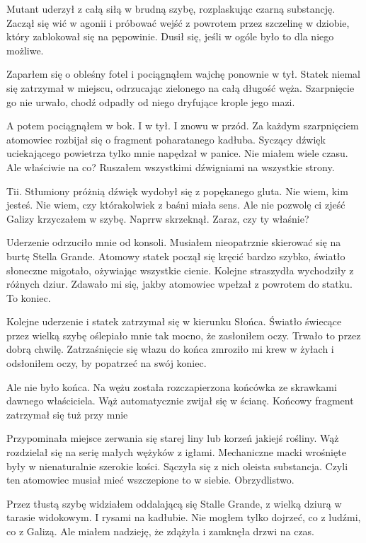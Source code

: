 Mutant uderzył z całą siłą w brudną szybę, rozplaskując czarną substancję. 
Zaczął się wić w agonii i próbować wejść z powrotem przez szczelinę w dziobie, który zablokował się na pępowinie.
Dusił się, jeśli w ogóle było to dla niego możliwe.

Zaparłem się o obleśny fotel i pociągnąłem wajchę ponownie w tył. Statek niemal się zatrzymał w miejscu, odrzucając zielonego na całą długość węża.
Szarpnięcie go nie urwało, chodź odpadły od niego dryfujące krople jego mazi.

A potem pociągnąłem w bok. I w tył. I znowu w przód.
Za każdym szarpnięciem atomowiec rozbijał się o fragment poharatanego kadłuba.
Syczący dźwięk uciekającego powietrza tylko mnie napędzał w panice.
Nie miałem wiele czasu. Ale właściwie na co?
Ruszałem wszystkimi dźwigniami na wszystkie strony.

\begin{dialogue}
	\ds{} Tii. \dm{} Stłumiony próżnią dźwięk wydobył się z popękanego gluta.
	\ds{} Nie wiem, kim jesteś. Nie wiem, czy którakolwiek z baśni miała sens. Ale nie pozwolę ci zjeść Galizy \dm{} krzyczałem w szybę. 
	\ds{} Naprrw \dm{} skrzeknął.
	\ds{} Zaraz, czy ty właśnie?
\end{dialogue}

Uderzenie odrzuciło mnie od konsoli.
Musiałem nieopatrznie skierować się na burtę Stella Grande.
Atomowy statek począł się kręcić bardzo szybko, światło słoneczne migotało, ożywiając wszystkie cienie.
Kolejne straszydła wychodziły z różnych dziur.
Zdawało mi się, jakby atomowiec wpełzał z powrotem do statku.
To koniec.

Kolejne uderzenie i statek zatrzymał się w kierunku Słońca.
Światło świecące przez wielką szybę oślepiało mnie tak mocno, że zasłoniłem oczy.
Trwało to przez dobrą chwilę.
Zatrzaśnięcie się włazu do końca zmroziło mi krew w żyłach i odsłoniłem oczy, by popatrzeć na swój koniec.

Ale nie było końca.
Na wężu została rozczapierzona końcówka ze skrawkami dawnego właściciela.
Wąż automatycznie zwijał się w ścianę.
Końcowy fragment zatrzymał się tuż przy mnie

Przypominała miejsce zerwania się starej liny lub korzeń jakiejś rośliny.
Wąż rozdzielał się na serię małych wężyków z igłami.
Mechaniczne macki wrośnięte były w nienaturalnie szerokie kości.
Sączyła się z nich oleista substancja.
Czyli ten atomowiec musiał mieć wszczepione to w siebie.
Obrzydlistwo.

Przez tłustą szybę widziałem oddalającą się Stalle Grande, z wielką dziurą w tarasie widokowym.
I rysami na kadłubie.
Nie mogłem tylko dojrzeć, co z ludźmi, co z Galizą.
Ale miałem nadzieję, że zdążyła i zamknęła drzwi na czas.

